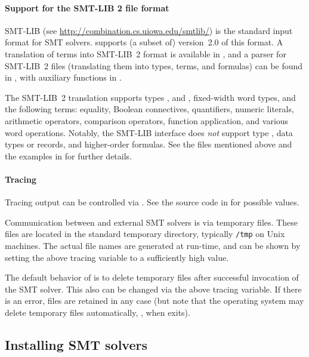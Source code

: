 \paragraph{Support for the SMT-LIB 2 file format}

SMT-LIB (see \url{http://combination.cs.uiowa.edu/smtlib/}) is the
standard input format for SMT solvers.   supports (a
subset of) version~2.0 of this format.  A translation of \HOL{} terms
into SMT-LIB~2 format is available in , and a parser
for SMT-LIB~2 files (translating them into \HOL{} types, terms, and
formulas) can be found in , with auxiliary
functions in .

The SMT-LIB~2 translation supports types , 
and , fixed-width word types, and the following terms:
equality, Boolean connectives, quantifiers, numeric literals,
arithmetic operators, comparison operators, function application, and
various word operations.  Notably, the SMT-LIB interface does
\emph{not} support type , data types or records, and
higher-order formulas.  See the files mentioned above and the examples
in  for further details.

\paragraph{Tracing}

Tracing output can be controlled via .  See the source code in  for
possible values.

Communication between \HOL{} and external SMT solvers is via temporary
files.  These files are located in the standard temporary directory,
typically {\tt /tmp} on Unix machines.  The actual file names are
generated at run-time, and can be shown by setting the above tracing
variable to a sufficiently high value.

The default behavior of  is to delete temporary files
after successful invocation of the SMT solver.  This also can be
changed via the above tracing variable.  If there is an error, files
are retained in any case (but note that the operating system may
delete temporary files automatically, \eg, when \HOL{} exits).

\subsection{Installing SMT solvers}

